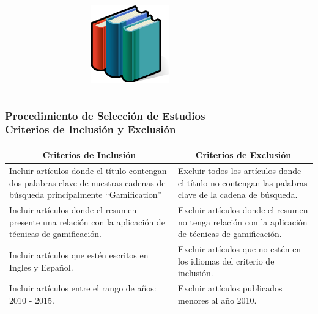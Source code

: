 \documentclass{beamer}
\begin{document}
\begin{frame}
\begin{columns}[c]
\begin{figure}
\begin{center}
    		\end{center}
    	\end{figure}
    	\begin{figure}
    		\begin{center}
    			\includegraphics[scale=0.2]{images/2icons/books.png}
    		\end{center}
    	\end{figure}
    \end{columns}
\end{frame}


\begin{frame}
    \frametitle{Procedimiento de Selección de Estudios\\ Criterios de Inclusión y Exclusión}
	
	\begin{table}
		\begin{center}
			\begin{tabular}{| p{5.5cm} | p{5.5cm} |}
				\hline
				\multicolumn{1}{|c|}{\textbf{Criterios de Inclusión}} & \multicolumn{1}{|c|}{\textbf{Criterios de Exclusión}} \\
				\hline
				Incluir artículos donde el título contengan dos palabras clave de nuestras cadenas de búsqueda principalmente ``Gamification''{ }& Excluir todos los artículos donde el título no contengan las palabras clave de la cadena de búsqueda.\\
				\hline
				Incluir artículos donde el resumen presente una relación con la aplicación de técnicas de  gamificación. & Excluir artículos donde el resumen no tenga relación con la aplicación de técnicas de gamificación.\\
				\hline
				Incluir artículos que estén escritos en Ingles y Español. & Excluir artículos que no estén en los idiomas del criterio de inclusión.\\ \hline
				Incluir artículos entre el rango de años: 2010 - 2015. & Excluir artículos publicados menores al año 2010.\\
				\hline
			\end{tabular}
		\end{center}
	\end{table}
\end{frame}
\end{document}
